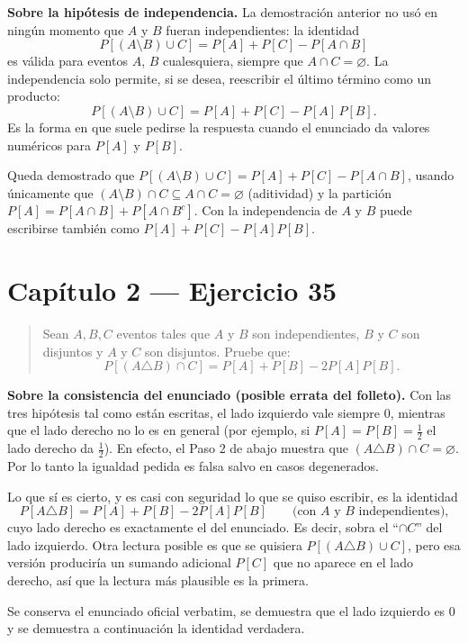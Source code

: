 \documentclass[11pt]{article}
\begin{document}
\begin{nota}
\textbf{Sobre la hip\'otesis de independencia.} La demostraci\'on anterior no us\'o en ning\'un momento que $A$ y $B$ fueran independientes: la identidad
\[
P[(A\setminus B)\cup C]=P[A]+P[C]-P[A\cap B]
\]
es v\'alida para eventos $A$, $B$ cualesquiera, siempre que $A\cap C=\varnothing$. La independencia solo permite, si se desea, reescribir el \'ultimo t\'ermino como un producto:
\[
P[(A\setminus B)\cup C]=P[A]+P[C]-P[A]\,P[B].
\]
Es la forma en que suele pedirse la respuesta cuando el enunciado da valores num\'ericos para $P[A]$ y $P[B]$.
\end{nota}

\begin{resp}
Queda demostrado que $P[(A\setminus B)\cup C]=P[A]+P[C]-P[A\cap B]$, usando \'unicamente que $(A\setminus B)\cap C\subseteq A\cap C=\varnothing$ (aditividad) y la partici\'on $P[A]=P[A\cap B]+P[A\cap B^{c}]$. Con la independencia de $A$ y $B$ puede escribirse tambi\'en como $P[A]+P[C]-P[A]P[B]$.
\end{resp}

\section*{Cap\'itulo 2 --- Ejercicio 35}

\begin{quote}
Sean $A,B,C$ eventos tales que $A$ y $B$ son independientes, $B$ y $C$ son disjuntos y $A$ y $C$ son disjuntos. Pruebe que:
\[
P[(A\triangle B)\cap C]=P[A]+P[B]-2P[A]P[B].
\]
\end{quote}

\begin{nota}
\textbf{Sobre la consistencia del enunciado (posible errata del folleto).} Con las tres hip\'otesis tal como est\'an escritas, el lado izquierdo vale siempre $0$, mientras que el lado derecho no lo es en general (por ejemplo, si $P[A]=P[B]=\tfrac{1}{2}$ el lado derecho da $\tfrac{1}{2}$). En efecto, el Paso 2 de abajo muestra que $(A\triangle B)\cap C=\varnothing$. Por lo tanto la igualdad pedida es falsa salvo en casos degenerados.

Lo que s\'i es cierto, y es casi con seguridad lo que se quiso escribir, es la identidad
\[
P[A\triangle B]=P[A]+P[B]-2P[A]P[B]
\qquad\text{(con $A$ y $B$ independientes),}
\]
cuyo lado derecho es exactamente el del enunciado. Es decir, sobra el ``$\cap C$'' del lado izquierdo. Otra lectura posible es que se quisiera $P[(A\triangle B)\cup C]$, pero esa versi\'on producir\'ia un sumando adicional $P[C]$ que no aparece en el lado derecho, as\'i que la lectura m\'as plausible es la primera.

Se conserva el enunciado oficial verbatim, se demuestra que el lado izquierdo es $0$ y se demuestra a continuaci\'on la identidad verdadera.
\end{nota}
\end{document}
